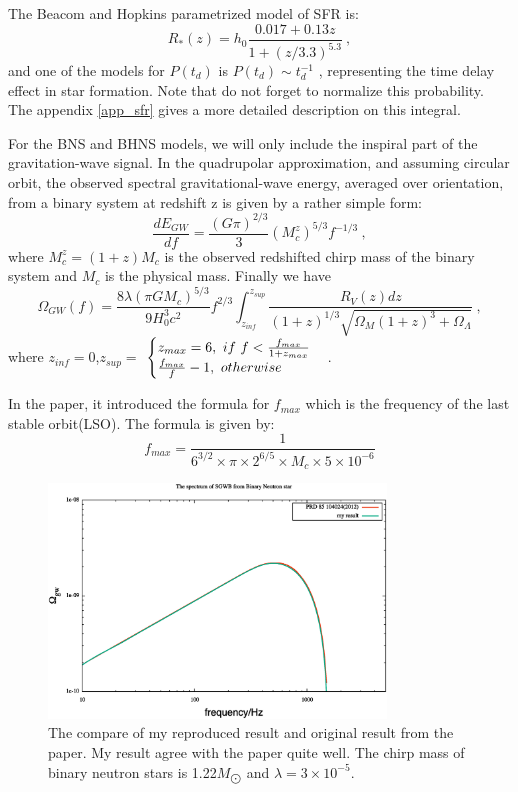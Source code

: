 \documentclass[11pt, a4paper]{article}
\begin{document}
The Beacom and Hopkins parametrized model of SFR\cite{Hopkins2006} is:
\begin{equation}
R_*(z)=h_0\frac{0.017+0.13z}{1+(z/3.3)^{5.3}}~,
\end{equation}
and one of the models for $P(t_d)$ is  $P(t_d)\sim t_d^{-1}$ , representing the time delay effect in star formation. Note that do not forget to normalize this probability. The appendix \ref{app_sfr} gives a more detailed description on this integral. 


For the BNS and BHNS models, we will only include the inspiral part of the gravitation-wave signal. In the quadrupolar approximation, and assuming circular orbit, the observed spectral gravitational-wave energy, averaged over orientation, from a binary system at redshift z is given by a rather simple form:
\begin{equation}
\frac{dE_{GW}}{df}=\frac{(G\pi)^{2/3}}{3}(M_c^z)^{5/3}f^{-1/3}~,
\end{equation}
where $M_c^z=(1+z)M_c$ is the observed redshifted chirp mass of the binary system and $M_c$ is the physical mass. Finally we have
\begin{equation}
\Omega_{GW}(f)=\frac{8\lambda (\pi GM_c)^{5/3}}{9H_0^3 c^2}f^{2/3}\int ^{z_{sup}}_{z_{inf}}\frac{R_V(z)dz}{(1+z)^{1/3}{\sqrt {\Omega_M(1+z)^3+\Omega_\Lambda}}}~,\label{spec}
\end{equation}
where $z_{inf}=0$,$z_{sup}=$
$
\centering
\begin{cases}
z_{max}=6,~ if~ f<\frac {f_{max}}{1+z_{max}} \\
\frac {f_{max}}{f}-1,~otherwise
\end{cases}
$. 

In the paper\cite{Sathyaprakash2001}, it introduced the formula for $f_{max}$ which is the frequency of the last stable orbit(LSO). The formula is given by:
\begin{equation}
f_{max}=\frac{1}{6^{3/2}\times\pi\times2^{6/5} \times M_c \times  5\times10^{-6}}
\end{equation}

\begin{figure}[htbp]
  \centering
  \includegraphics[width=0.8\textwidth]{fig1.eps}
  \caption{The compare of my reproduced result and original result from the paper\cite{Wu2012}. My result agree with the paper quite well. The chirp mass of binary neutron stars is 1.22$M_{\bigodot}$ and $\lambda=3\times 10^{-5}$.}\label{fig:BNS} 
\end{figure}
\end{document}
